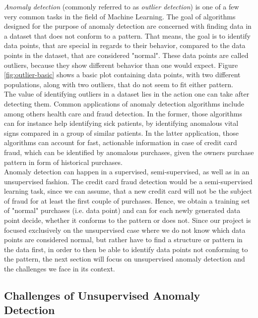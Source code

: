 \documentclass{vldb}
\begin{document}
\textit{Anomaly detection} (commonly referred to as \textit{outlier detection}) is one of a few very common tasks in the field of Machine Learning. The goal of algorithms designed for the purpose of anomaly detection are concerned with finding data in a dataset that does not conform to a pattern. That means, the goal is to identify data points, that are special in regards to their behavior, compared to the data points in the dataset, that are considered "normal". \cite{survey:anomaly-detection} These data points are called outliers, because they show different behavior than one would expect. Figure \ref{fig:outlier-basic} shows a basic plot containing data points, with two different populations, along with two outliers, that do not seem to fit either pattern.\\
The value of identifying outliers in a dataset lies in the action one can take after detecting them. Common applications of anomaly detection algorithms include among others health care and fraud detection. In the former, those algorithms can for instance help identifying sick patients, by identifying anomalous vital signs compared in a group of similar patients. In the latter application, those algorithms can account for fast, actionable information in case of credit card fraud, which can be identified by anomalous purchases, given the owners purchase pattern in form of historical purchases. \\
Anomaly detection can happen in a supervised, semi-super\-vised, as well as in an unsupervised fashion. The credit card fraud detection would be a semi-supervised learning task, since we can assume, that a new credit card will not be the subject of fraud for at least the first couple of purchases. Hence, we obtain a training set of "normal" purchases (i.e. data point) and can for each newly generated data point decide, whether it conforms to the pattern or does not. Since our project is focused exclusively on the unsupervised case where we do not know which data points are considered normal, but rather have to find a structure or pattern in the data first, in order to then be able to identify data points not conforming to the pattern, the next section will focus on unsupervised anomaly detection and the challenges we face in its context.



\subsection{Challenges of Unsupervised Anomaly Detection}
\label{subsec:Intro-challenges}
\end{document}
